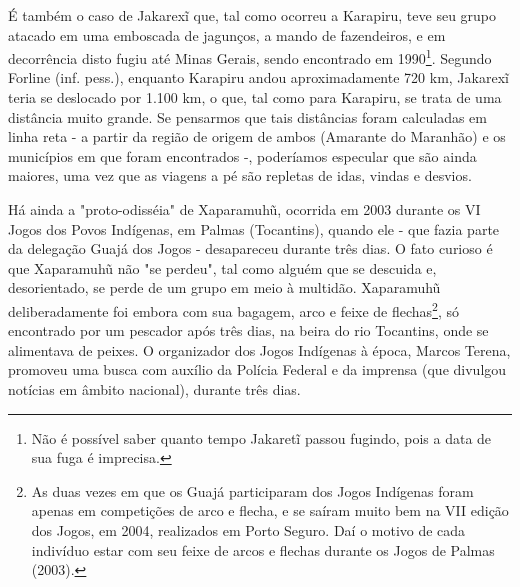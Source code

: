 É também o caso de Jakarexĩ que, tal como ocorreu a Karapiru, teve seu
grupo atacado em uma emboscada de jagunços, a mando de fazendeiros, e em
decorrência disto fugiu até Minas Gerais, sendo encontrado em
1990\footnote{Não é possível saber quanto tempo Jakaretĩ passou fugindo,
  pois a data de sua fuga é imprecisa.}. Segundo Forline (inf. pess.),
enquanto Karapiru andou aproximadamente 720 km, Jakarexĩ teria se
deslocado por 1.100 km, o que, tal como para Karapiru, se trata de uma
distância muito grande. Se pensarmos que tais distâncias foram
calculadas em linha reta - a partir da região de origem de ambos
(Amarante do Maranhão) e os municípios em que foram encontrados -,
poderíamos especular que são ainda maiores, uma vez que as viagens a pé
são repletas de idas, vindas e desvios.

Há ainda a "proto-odisséia" de Xaparamuhũ, ocorrida em 2003 durante os
VI Jogos dos Povos Indígenas, em Palmas (Tocantins), quando ele - que
fazia parte da delegação Guajá dos Jogos - desapareceu durante três
dias. O fato curioso é que Xaparamuhũ não "se perdeu", tal como alguém
que se descuida e, desorientado, se perde de um grupo em meio à
multidão. Xaparamuhũ deliberadamente foi embora com sua bagagem, arco e
feixe de flechas\footnote{As duas vezes em que os Guajá participaram dos
  Jogos Indígenas foram apenas em competições de arco e flecha, e se
  saíram muito bem na VII edição dos Jogos, em 2004, realizados em Porto
  Seguro. Daí o motivo de cada indivíduo estar com seu feixe de arcos e
  flechas durante os Jogos de Palmas (2003).}, só encontrado por um
pescador após três dias, na beira do rio Tocantins, onde se alimentava
de peixes. O organizador dos Jogos Indígenas à época, Marcos Terena,
promoveu uma busca com auxílio da Polícia Federal e da imprensa (que
divulgou notícias em âmbito nacional), durante três dias.

